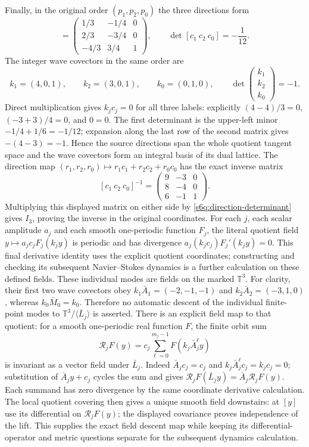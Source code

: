 Finally, in the original order $(p_1,p_2,p_0)$ the three directions form
\begin{equation}
 [c_1\ c_2\ c_0]
 =\begin{pmatrix}
 1/3&-1/4&0\\2/3&-3/4&0\\-4/3&3/4&1
 \end{pmatrix},\qquad
 \det[c_1\ c_2\ c_0]=-\frac1{12}.
 \label{s6q:direction-determinant}
\end{equation}
The integer wave covectors in the same order are
\begin{equation}
 k_1=(4,0,1),\qquad k_2=(3,0,1),\qquad k_0=(0,1,0),
 \qquad
 \det\begin{pmatrix}k_1\\k_2\\k_0\end{pmatrix}=-1.
 \label{s6q:wave-covectors}
\end{equation}
Direct multiplication gives $k_jc_j=0$ for all three labels: explicitly
$(4-4)/3=0$, $(-3+3)/4=0$, and $0=0$. The first determinant is the
upper-left minor $-1/4+1/6=-1/12$; expansion along the last row of the
second matrix gives $-(4-3)=-1$. Hence the source directions span the
whole quotient tangent space and the wave covectors form an integral
basis of its dual lattice. The direction map
$(r_1,r_2,r_0)\mapsto r_1c_1+r_2c_2+r_0c_0$ has the exact inverse matrix
\[
 [c_1\ c_2\ c_0]^{-1}
   =\begin{pmatrix}9&-3&0\\8&-4&0\\6&-1&1\end{pmatrix}.
\]
Multiplying this displayed matrix on either side by
\eqref{s6q:direction-determinant} gives $I_3$, proving the inverse in
the original coordinates. For each $j$, each scalar amplitude $a_j$ and
each smooth one-periodic function $F_j$, the literal quotient field
$y\mapsto a_jc_jF_j(k_jy)$ is periodic and has divergence
$a_j(k_jc_j)F_j'(k_jy)=0$. This final derivative identity uses the
explicit quotient coordinates; constructing and checking its subsequent
Navier--Stokes dynamics is a further calculation on these defined fields.
These individual modes are fields on the marked $\mathbb T^3$. For
clarity, their first two wave covectors obey
$k_1\bar A_1=(-2,-1,-1)$ and $k_2\bar A_2=(-3,1,0)$, whereas
$k_0\bar M_0=k_0$. Therefore no automatic descent of the individual
finite-point modes to $\mathbb T^3/\langle\bar L_j\rangle$ is asserted.
There is an explicit field map to that quotient: for a smooth
one-periodic real function $F$, the finite orbit sum
\[
 \mathcal R_jF(y)=c_j\sum_{\ell=0}^{m_j-1}
                         F(k_j\bar A_j^\ell y)
\]
is invariant as a vector field under $\bar L_j$. Indeed
$\bar A_jc_j=c_j$ and
$k_j\bar A_j^\ell c_j=k_jc_j=0$; substitution of
$\bar A_jy+c_j$ cycles the sum and gives
$\mathcal R_jF(\bar L_jy)=\bar A_j\mathcal R_jF(y)$.
Each summand has zero divergence by the same coordinate derivative
calculation. The local quotient covering then gives a unique smooth
field downstairs: at $[y]$ use its differential on $\mathcal R_jF(y)$;
the displayed covariance proves independence of the lift. This supplies
the exact field descent map while keeping its differential-operator
and metric questions separate for the subsequent dynamics calculation.
